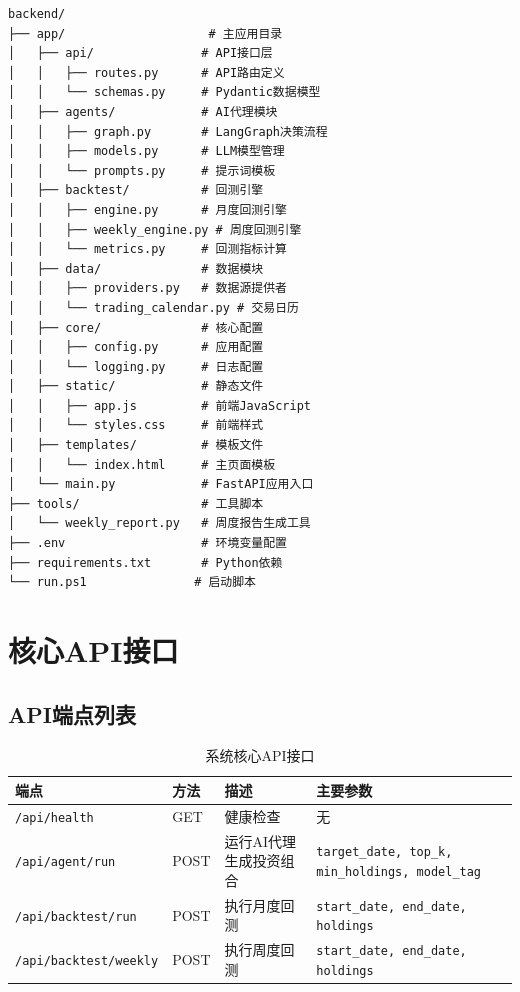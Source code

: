 \documentclass[12pt,a4paper]{ctexart}
\begin{document}
\begin{verbatim}
backend/
├── app/                    # 主应用目录
│   ├── api/               # API接口层
│   │   ├── routes.py      # API路由定义
│   │   └── schemas.py     # Pydantic数据模型
│   ├── agents/            # AI代理模块
│   │   ├── graph.py       # LangGraph决策流程
│   │   ├── models.py      # LLM模型管理
│   │   └── prompts.py     # 提示词模板
│   ├── backtest/          # 回测引擎
│   │   ├── engine.py      # 月度回测引擎
│   │   ├── weekly_engine.py # 周度回测引擎
│   │   └── metrics.py     # 回测指标计算
│   ├── data/              # 数据模块
│   │   ├── providers.py   # 数据源提供者
│   │   └── trading_calendar.py # 交易日历
│   ├── core/              # 核心配置
│   │   ├── config.py      # 应用配置
│   │   └── logging.py     # 日志配置
│   ├── static/            # 静态文件
│   │   ├── app.js         # 前端JavaScript
│   │   └── styles.css     # 前端样式
│   ├── templates/         # 模板文件
│   │   └── index.html     # 主页面模板
│   └── main.py            # FastAPI应用入口
├── tools/                 # 工具脚本
│   └── weekly_report.py   # 周度报告生成工具
├── .env                   # 环境变量配置
├── requirements.txt       # Python依赖
└── run.ps1               # 启动脚本
\end{verbatim}

\section{核心API接口}

\subsection{API端点列表}

\begin{table}[H]
    \centering
    \caption{系统核心API接口}
    \begin{tabular}{lllp{}}
        \toprule
        \textbf{端点} & \textbf{方法} & \textbf{描述} & \textbf{主要参数} \\
        \midrule
        \texttt{/api/health} & GET & 健康检查 & 无 \\
        \texttt{/api/agent/run} & POST & 运行AI代理生成投资组合 & \texttt{target\_date, top\_k, min\_holdings, model\_tag} \\
        \texttt{/api/backtest/run} & POST & 执行月度回测 & \texttt{start\_date, end\_date, holdings} \\
        \texttt{/api/backtest/weekly} & POST & 执行周度回测 & \texttt{start\_date, end\_date, holdings} \\
        \bottomrule
    \end{tabular}
\end{table}
\end{document}
